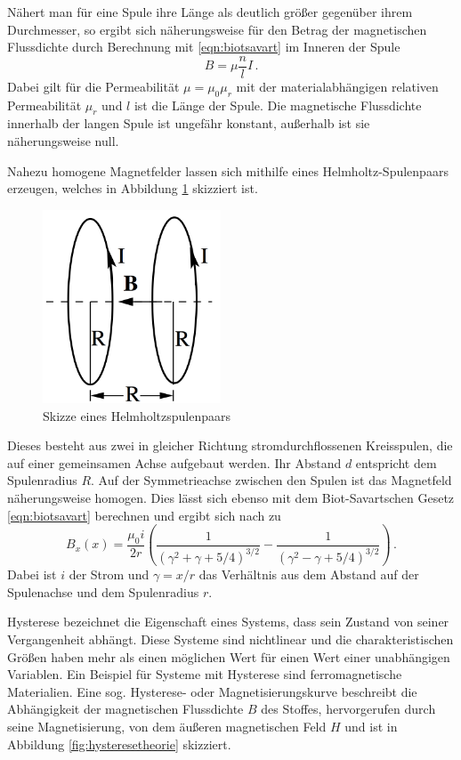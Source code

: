 Nähert man für eine Spule ihre Länge als deutlich größer gegenüber ihrem Durchmesser,
so ergibt sich näherungsweise für den Betrag der magnetischen Flussdichte durch Berechnung mit \eqref{eqn:biotsavart}
im Inneren der Spule
\begin{equation}
  B = \mu \frac{n}{l} I\,.
  \label{eqn:langespuleinnen}
\end{equation}
Dabei gilt für die Permeabilität $\mu = \mu_0 \mu_r$ mit der materialabhängigen
relativen Permeabilität $\mu_r$ und $l$ ist die Länge der Spule.
Die magnetische Flussdichte innerhalb der langen Spule ist ungefähr konstant, außerhalb
ist sie näherungsweise null.

Nahezu homogene Magnetfelder lassen sich mithilfe eines Helmholtz-Spulenpaars erzeugen, welches
in Abbildung \ref{fig:helmholtz} skizziert ist.

\begin{figure}
  \centering
  \includegraphics[width=150pt]{data/helmholtz.png}
  \caption{Skizze eines Helmholtzspulenpaars \cite{Versuchsanleitung}}
  \label{fig:helmholtz}
\end{figure}

Dieses besteht aus zwei in gleicher Richtung stromdurchflossenen Kreisspulen, die
auf einer gemeinsamen Achse aufgebaut werden. Ihr Abstand $d$ entspricht dem Spulenradius $R$.
Auf der Symmetrieachse zwischen den Spulen ist das Magnetfeld näherungsweise homogen. Dies lässt sich
ebenso mit dem Biot-Savartschen Gesetz \eqref{eqn:biotsavart} berechnen und ergibt sich nach \cite{Helmholtz} zu
\begin{equation}
  B_x(x) = \frac{\mu_0 i}{2 r} \left( \frac{1}{(\gamma^2+\gamma+5/4)^{3/2}} - \frac{1}{(\gamma^2-\gamma+5/4)^{3/2}} \right) \,.
  \label{eqn:helmholz}
\end{equation}
Dabei ist $i$ der Strom und $\gamma = x/r$ das Verhältnis aus dem Abstand auf der Spulenachse und dem Spulenradius $r$.

Hysterese bezeichnet die Eigenschaft eines Systems, dass sein Zustand von seiner Vergangenheit abhängt.
Diese Systeme sind nichtlinear und die charakteristischen Größen haben mehr als einen möglichen Wert für
einen Wert einer unabhängigen Variablen. Ein Beispiel für Systeme mit Hysterese sind
ferromagnetische Materialien. Eine sog. Hysterese- oder Magnetisierungskurve beschreibt
die Abhängigkeit der magnetischen Flussdichte $B$ des Stoffes, hervorgerufen durch
seine Magnetisierung, von dem äußeren magnetischen Feld $H$ und ist in Abbildung \ref{fig:hysteresetheorie}
skizziert.

